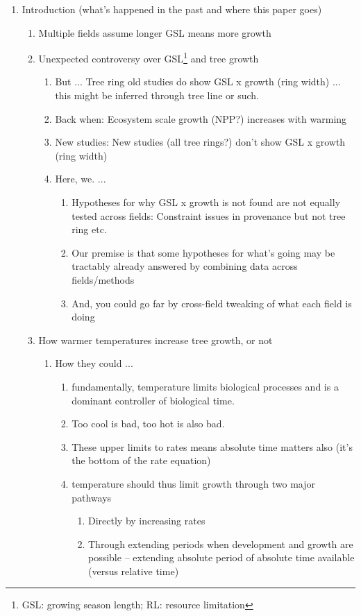 \documentclass[11pt,letter]{article}
\begin{document}
\begin{enumerate}
\item Introduction (what's happened in the past and where this paper goes)
\begin{enumerate}
\item Multiple fields assume longer GSL means more growth 
\item Unexpected controversy over GSL\footnote{GSL: growing season length;  RL: resource limitation} and tree growth 
\begin{enumerate}
\item But ... Tree ring old studies do show GSL x growth (ring width) ... this might be inferred through tree line or such.
\item Back when: Ecosystem scale growth (NPP?) increases with warming
\item New studies: New studies (all tree rings?) don't show GSL x growth (ring width)
\item Here, we. ...
\begin{enumerate}
\item Hypotheses for why GSL x growth is not found are not equally tested across fields: Constraint issues in provenance but not tree ring etc.
\item Our premise is that some hypotheses for what's going may be tractably already answered by combining data across fields/methods
\item And, you could go far by cross-field tweaking of what each field is doing
\end{enumerate}
\end{enumerate}
\item How warmer temperatures increase tree growth, or not
\begin{enumerate}
\item How they could ...
\begin{enumerate}
\item fundamentally, temperature limits biological processes and is a dominant controller of biological time. 
\item Too cool is bad, too hot is also bad. 
\item These upper limits to rates means absolute time matters also (it's the bottom of the rate equation)
\item temperature should thus limit growth through two major pathways
\begin{enumerate}
\item Directly by increasing rates
\item Through extending periods when development and growth are possible -- extending absolute period of absolute time available (versus relative time)

\end{enumerate}
\end{enumerate}
\end{enumerate}
\end{enumerate}
\end{enumerate}
\end{document}
